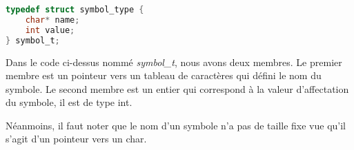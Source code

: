 \lstset{style=mystyle}
\begin{lstlisting}[language=C, caption=Structure d'un symbole]
typedef struct symbol_type {
    char* name;
    int value;
} symbol_t;
\end{lstlisting}

Dans le code ci-dessus nommé \textit{symbol\_t}, nous avons deux membres. Le premier membre est un pointeur vers un tableau de caractères qui défini le nom du symbole. Le second membre est un entier qui correspond à la valeur d'affectation du symbole, il est de type int.

Néanmoins, il faut noter que le nom d'un symbole n'a pas de taille fixe vue qu'il s'agit d'un pointeur vers un char.

\newpage